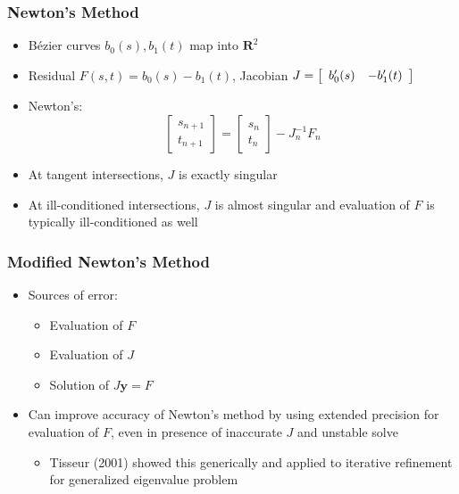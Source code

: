 \documentclass{beamer}
\begin{document}
\begin{frame}
\frametitle{Newton's Method}
\begin{itemize}
\item B\'{e}zier curves \(b_0(s), b_1(t)\) map into \(\mathbf{R}^2\)
\pause
\item Residual \(F(s, t) = b_0(s) - b_1(t)\), Jacobian \(J =
\left[ \begin{array}{c c} b_0'(s) & -b_1'(t) \end{array}\right]\)
\pause
\item Newton's:
\begin{equation*}
\left[ \begin{array}{c} s_{n + 1} \\ t_{n + 1} \end{array}\right] =
\left[ \begin{array}{c} s_n \\ t_n \end{array}\right] -
J_n^{-1} F_n
\end{equation*}
\pause
\item At tangent intersections, \(J\) is exactly singular
\pause
\item At ill-conditioned intersections, \(J\) is almost singular and
  evaluation of \(F\) is typically ill-conditioned as well
\end{itemize}
\end{frame}

\begin{frame}
\frametitle{Modified Newton's Method}
\begin{itemize}
\item Sources of error:
\begin{itemize}
\pause
\item Evaluation of \(F\)
\pause
\item Evaluation of \(J\)
\pause
\item Solution of \(J \bm{y} = F\)
\end{itemize}
\pause
\item Can improve accuracy of Newton's method by using extended
  precision for evaluation of \(F\), even in presence of
  inaccurate \(J\) and unstable solve
\begin{itemize}
\pause
\item Tisseur (2001) showed this generically and applied to iterative
  refinement for generalized eigenvalue problem
\end{itemize}
\end{itemize}
\end{frame}
\end{document}
